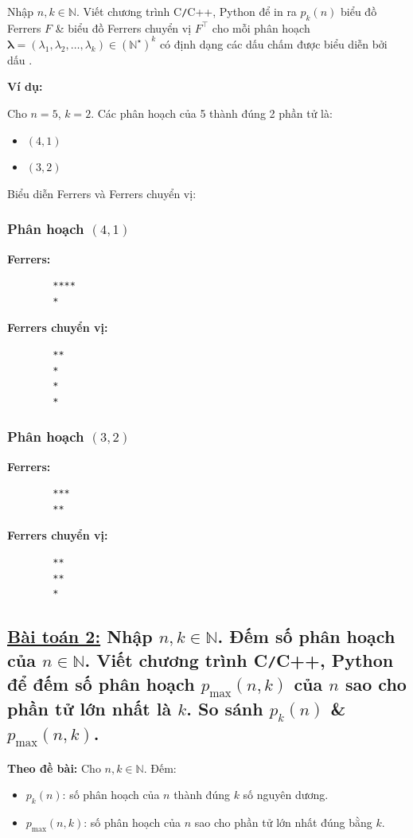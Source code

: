 \documentclass{article}
\begin{document}
	Nhập $n,k\in\mathbb{N}$. Viết chương trình {\sf C{\tt/}C++, Python} để in ra $p_k(n)$ biểu đồ Ferrers $F$ \& biểu đồ Ferrers chuyển vị $F^\top$ cho mỗi phân hoạch $\boldsymbol{\lambda} = (\lambda_1,\lambda_2,\ldots,\lambda_k)\in(\mathbb{N}^\star)^k$ có định dạng các dấu chấm được biểu diễn bởi dấu {\tt*}.
	
	\textbf{Ví dụ:}
	
	Cho $n = 5$, $k = 2$. Các phân hoạch của 5 thành đúng 2 phần tử là:
	
	\begin{itemize}
		\item $(4,1)$
		\item $(3,2)$
	\end{itemize}
	
	Biểu diễn Ferrers và Ferrers chuyển vị:
	
	\subsubsection*{Phân hoạch $(4,1)$}
	
	\textbf{Ferrers:}
	\begin{Verbatim}
		****
		*
	\end{Verbatim}
	
	\textbf{Ferrers chuyển vị:}
	\begin{Verbatim}
		**
		*
		*
		*
	\end{Verbatim}
	
	\subsubsection*{Phân hoạch $(3,2)$}
	
	\textbf{Ferrers:}
	\begin{Verbatim}
		***
		**
	\end{Verbatim}
	
	\textbf{Ferrers chuyển vị:}
	\begin{Verbatim}
		**
		**
		*
	\end{Verbatim}
	
	\subsection*{\underline{Bài toán 2:} Nhập $n,k\in\mathbb{N}$. Đếm số phân hoạch của $n\in\mathbb{N}$. Viết chương trình {\sf C{\tt/}C++, Python} để đếm số phân hoạch $p_{\max}(n,k)$ của $n$ sao cho phần tử lớn nhất là $k$. So sánh $p_k(n)$ \& $p_{\max}(n,k)$.
	}
	
	\textbf{Theo đề bài:} Cho $n, k \in \mathbb{N}$. Đếm:
	\begin{itemize}
		\item $p_k(n)$: số phân hoạch của $n$ thành đúng $k$ số nguyên dương.
		\item $p_{\max}(n, k)$: số phân hoạch của $n$ sao cho phần tử lớn nhất đúng bằng $k$.
	\end{itemize}
	
\end{document}
